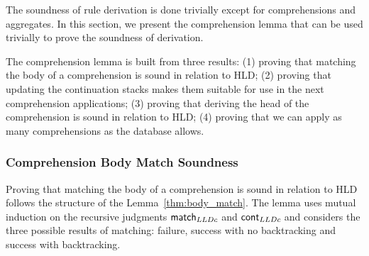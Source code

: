 The soundness of rule derivation is done trivially except for comprehensions and aggregates. In this section, we present
the comprehension lemma that can be used trivially to prove the soundness of derivation.

The comprehension lemma is built from three results: (1) proving that matching the body of a comprehension is sound
in relation to HLD;
(2) proving that updating the continuation stacks makes them suitable for use in the next comprehension applications;
(3) proving that deriving the head of the comprehension is sound in relation to HLD;
(4) proving that we can apply as many comprehensions as the database allows.

\subsubsection{Comprehension Body Match Soundness}

Proving that matching the body of a comprehension is sound in relation to HLD follows the structure of the Lemma~\ref{thm:body_match}. The lemma uses mutual induction on the recursive judgments $\mathsf{match}_{LLDc} \;$and $\mathsf{cont}_{LLDc} \;$and
considers the three possible results of matching: failure, success with no backtracking and success with backtracking.

